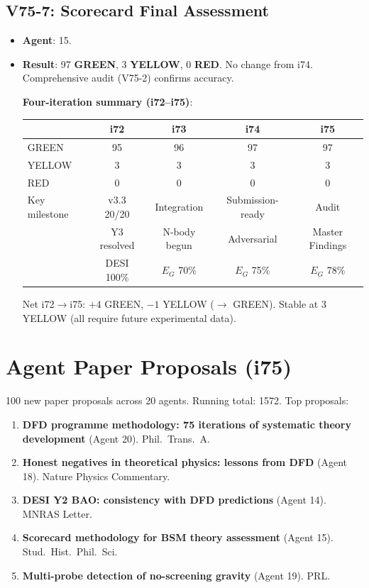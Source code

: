 \documentclass[11pt,a4paper]{article}
\newcommand{\GREEN}{\textcolor{dfdgreen}{\textbf{GREEN}}}
\newcommand{\YELLOW}{\textcolor{dfdyellow}{\textbf{YELLOW}}}
\newcommand{\RED}{\textcolor{dfdred}{\textbf{RED}}}
\begin{document}
\subsection{V75-7: Scorecard Final Assessment}
\begin{itemize}[nosep]
\item \textbf{Agent}: 15.
\item \textbf{Result}: 97 \GREEN, 3 \YELLOW, 0 \RED. No change from i74. Comprehensive audit (V75-2) confirms accuracy.

\textbf{Four-iteration summary (i72--i75)}:
\begin{center}
\begin{tabular}{lcccc}
\toprule
& \textbf{i72} & \textbf{i73} & \textbf{i74} & \textbf{i75} \\
\midrule
GREEN & 95 & 96 & 97 & 97 \\
YELLOW & 3 & 3 & 3 & 3 \\
RED & 0 & 0 & 0 & 0 \\
\midrule
Key milestone & v3.3 20/20 & Integration & Submission-ready & Audit \\
 & Y3 resolved & N-body begun & Adversarial & Master Findings \\
 & DESI 100\% & $E_G$ 70\% & $E_G$ 75\% & $E_G$ 78\% \\
\bottomrule
\end{tabular}
\end{center}

Net i72$\to$i75: $+4$ GREEN, $-1$ YELLOW ($\to$ GREEN). Stable at 3 YELLOW (all require future experimental data).
\end{itemize}

\section{Agent Paper Proposals (i75)}

100 new paper proposals across 20 agents. Running total: 1572. Top proposals:

\begin{enumerate}[nosep]
\item \textbf{DFD programme methodology: 75 iterations of systematic theory development} (Agent 20). Phil.~Trans.~A.
\item \textbf{Honest negatives in theoretical physics: lessons from DFD} (Agent 18). Nature Physics Commentary.
\item \textbf{DESI Y2 BAO: consistency with DFD predictions} (Agent 14). MNRAS Letter.
\item \textbf{Scorecard methodology for BSM theory assessment} (Agent 15). Stud.~Hist.~Phil.~Sci.
\item \textbf{Multi-probe detection of no-screening gravity} (Agent 19). PRL.
\end{enumerate}
\end{document}
